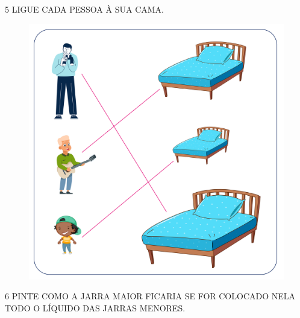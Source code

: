 \pagebreak
\num{5} LIGUE CADA PESSOA À SUA CAMA.


\begin{figure}[htpb!]
\centering
\includegraphics[width=.6\textwidth]{../ilustracoes/MAT1/SAEB_1ANO_MAT_FIGURA38.png}
\end{figure}


\num{6} PINTE COMO A JARRA MAIOR FICARIA SE FOR COLOCADO NELA TODO O LÍQUIDO DAS JARRAS MENORES.


